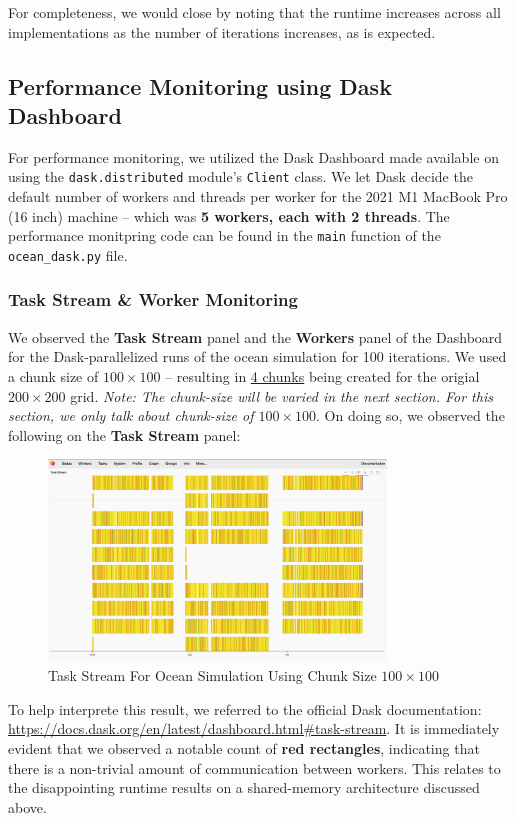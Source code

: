 \documentclass[a4paper,12pt]{article}
\begin{document}
For completeness, we would close by noting that the runtime increases across all implementations as the number of iterations increases, as is expected.

\subsection{Performance Monitoring using Dask Dashboard}
For performance monitoring, we utilized the Dask Dashboard made available on using the \verb|dask.distributed| module's \verb|Client| class.
We let Dask decide the default number of workers and threads per worker for the 2021 M1 MacBook Pro (16 inch) machine -- which was \textbf{5 workers, each with 2 threads}.
The performance monitpring code can be found in the \verb|main| function of the \verb|ocean_dask.py| file.

\subsubsection{Task Stream \& Worker Monitoring}
We observed the \textbf{Task Stream} panel and the \textbf{Workers} panel of the Dashboard for the Dask-parallelized runs of the ocean simulation for 100 iterations.
We used a chunk size of $100 \times 100$ -- resulting in \underline{4 chunks} being created for the origial $200 \times 200$ grid.
\textit{Note: The chunk-size will be varied in the next section. For this section, we only talk about chunk-size of $100 \times 100$}. 
On doing so, we observed the following on the \textbf{Task Stream} panel:

\begin{figure}[H]
  \centering
  \includegraphics[width=0.8\textwidth]{../images/task_stream_100chunk.png}
  \caption{Task Stream For Ocean Simulation Using Chunk Size $100 \times 100$}
\end{figure}

To help interprete this result, we referred to the official Dask documentation: \url{https://docs.dask.org/en/latest/dashboard.html#task-stream}.
It is immediately evident that we observed a notable count of \textbf{red rectangles}, indicating that there is a non-trivial amount of communication between workers.
This relates to the disappointing runtime results on a shared-memory architecture discussed above.
\end{document}

